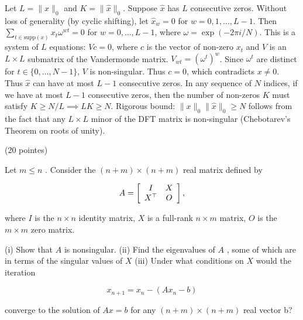 \begin{solution}
Let $L = \|x\|_0$ and $K = \|\hat{x}\|_0$. Suppose $\hat{x}$ has $L$ consecutive zeros. Without loss of generality (by cyclic shifting), let $\hat{x}_w = 0$ for $w = 0, 1, \dots, L-1$.
Then $\sum_{t \in \text{supp}(x)} x_t \omega^{wt} = 0$ for $w = 0, \dots, L-1$, where $\omega = \exp(-2\pi i/N)$.
This is a system of $L$ equations: $V c = 0$, where $c$ is the vector of non-zero $x_t$ and $V$ is an $L \times L$ submatrix of the Vandermonde matrix.
$V_{wt} = (\omega^t)^w$. Since $\omega^t$ are distinct for $t \in \{0, \dots, N-1\}$, $V$ is non-singular.
Thus $c = 0$, which contradicts $x \neq 0$. Thus $\hat{x}$ can have at most $L-1$ consecutive zeros.
In any sequence of $N$ indices, if we have at most $L-1$ consecutive zeros, then the number of non-zeros $K$ must satisfy $K \geq N/L \implies LK \geq N$.
Rigorous bound: $\|x\|_0 \|\hat{x}\|_0 \geq N$ follows from the fact that any $L \times L$ minor of the DFT matrix is non-singular (Chebotarev's Theorem on roots of unity).
\end{solution}

\begin{exercise}
\label{applied:2019:7}
(20 pointes)

Let $m \leqslant n$ . Consider the $( n + m ) \times ( n + m )$ real matrix defined by

\[
A = \left[ \begin{array}{c c} I & X \\ X ^ {\top} & O \end{array} \right],
\]

where $I$ is the $n \times n$ identity matrix, $X$ is a full-rank $n \times m$ matrix, $O$ is the $m \times m$ zero matrix.

(i) Show that $A$ is nonsingular.   
(ii) Find the eigenvalues of $A$ , some of which are in terms of the singular values of $X$   
(iii) Under what conditions on $X$ would the iteration

\[
x _ {n + 1} = x _ {n} - \left(A x _ {n} - b\right)
\]

converge to the solution of $A x = b$ for any $( n + m ) \times ( n + m )$ real vector b?
\end{exercise}

